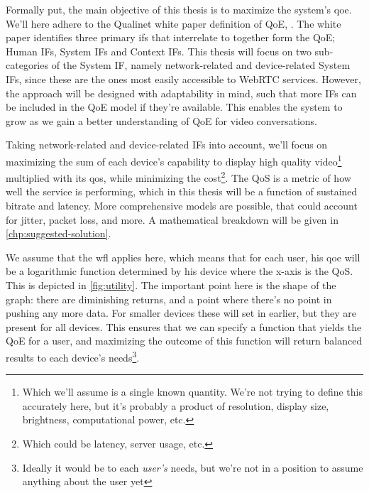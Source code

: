 Formally put, the main objective of this thesis is to maximize the system's \gls{qoe}. We'll here adhere to the Qualinet white paper definition of QoE,  \cite{qualinet}. The white paper identifies three primary \glspl{if} that interrelate to together form the QoE; Human IFs, System IFs and Context IFs. This thesis will focus on two sub-categories of the System IF, namely network-related and device-related System IFs, since these are the ones most easily accessible to WebRTC services. However, the approach will be designed with adaptability in mind, such that more IFs can be included in the QoE model if they're available. This enables the system to grow as we gain a better understanding of QoE for video conversations.

Taking network-related and device-related IFs into account, we'll focus on maximizing the sum of each device's capability to display high quality video\footnote{Which we'll assume is a single known quantity. We're not trying to define this accurately here, but it's probably a product of resolution, display size, brightness, computational power, etc.} multiplied with its \gls{qos}, while minimizing the cost\footnote{Which could be latency, server usage, etc.}. The QoS is a metric of how well the service is performing, which in this thesis will be a function of sustained bitrate and latency. More comprehensive models are possible, that could account for jitter, packet loss, and more. A mathematical breakdown will be given in \autoref{chp:suggested-solution}.

We assume that the \gls{wfl} applies here, which means that for each user, his \gls{qoe} will be a logarithmic function determined by his device where the x-axis is the QoS. This is depicted in \autoref{fig:utility}. The important point here is the shape of the graph: there are diminishing returns, and a point where there's no point in pushing any more data. For smaller devices these will set in earlier, but they are present for all devices. This ensures that we can specify a function that yields the QoE for a user, and maximizing the outcome of this function will return balanced results to each device's needs\footnote{Ideally it would be to each \emph{user's} needs, but we're not in a position to assume anything about the user yet}.

